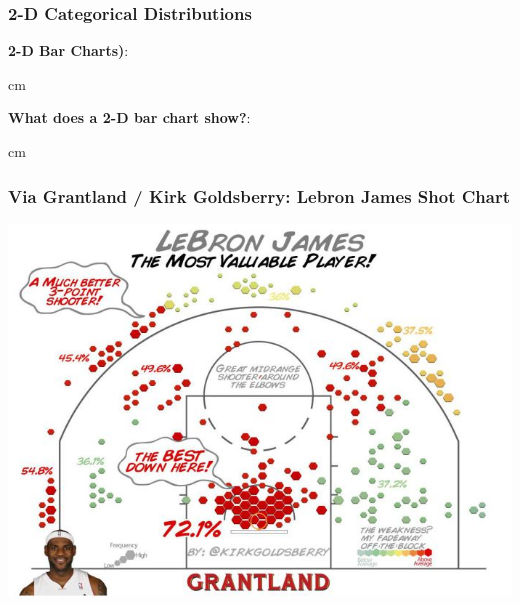 \documentclass{beamer} %
\begin{document}
\begin{frame}\frametitle{2-D Categorical Distributions}
	\small
	
	\textbf{2-D Bar Charts)}:  %
	
	 cm
	
	\textbf{What does a 2-D bar chart show?}:  %
	
	
	
	 cm
	
\end{frame}




\begin{frame}\frametitle{Via Grantland / Kirk Goldsberry:  Lebron James Shot Chart}
	\includegraphics[width=\linewidth]{lebron.jpg}
\end{frame}
\end{document}
